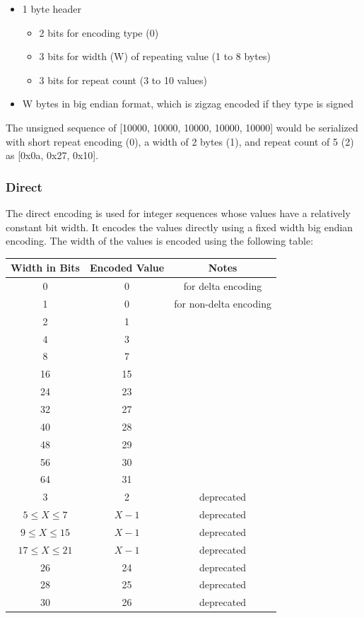 \documentclass{article}
\begin{document}
\begin{itemize}
\item 1 byte header
  \begin{itemize}
  \item 2 bits for encoding type (0)
  \item 3 bits for width (W) of repeating value (1 to 8 bytes)
  \item 3 bits for repeat count (3 to 10 values)
  \end{itemize}
\item W bytes in big endian format, which is zigzag encoded if they type
  is signed
\end{itemize}

The unsigned sequence of [10000, 10000, 10000, 10000, 10000] would be
serialized with short repeat encoding (0), a width of 2 bytes (1), and
repeat count of 5 (2) as [0x0a, 0x27, 0x10].

\subsubsection{Direct}

The direct encoding is used for integer sequences whose values have a
relatively constant bit width. It encodes the values directly using a
fixed width big endian encoding.  The width of the values is encoded
using the following table:

\vspace{10pt}
\begin{tabular}{| c | c | c |}
\hline
Width in Bits & Encoded Value & Notes\\
\hline
0 & 0 & for delta encoding \\
1 & 0 & for non-delta encoding \\
2 & 1 & \\
4 & 3 & \\
8 & 7 & \\
16 & 15 & \\
24 & 23 & \\
32 & 27 & \\
40 & 28 & \\
48 & 29 & \\
56 & 30 & \\
64 & 31 & \\
\hline
3 & 2 & deprecated \\
$5 \leq X \leq 7$ & $X - 1$ & deprecated \\
$9 \leq X \leq 15$ & $X - 1$ & deprecated \\
$17 \leq X \leq 21$ & $X - 1$ & deprecated \\
26 & 24 & deprecated \\
28 & 25 & deprecated \\
30 & 26 & deprecated \\
\hline
\end{tabular}
\end{document}
